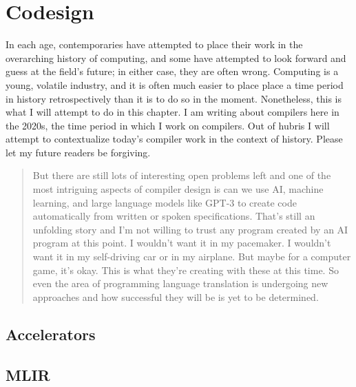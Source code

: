\chapter{Codesign}

In each age, contemporaries have attempted to place their work in the overarching history of computing,
and some have attempted to look forward and guess at the field's future;
in either case, they are often wrong.
Computing is a young, volatile industry, and it is often much easier to place
place a time period in history retrospectively than it is to do so in the moment.
Nonetheless, this is what I will attempt to do in this chapter.
I am writing about compilers here in the 2020s, the time period in which I work on compilers.
Out of hubris I will attempt to contextualize today's compiler work in the context of history.
Please let my future readers be forgiving.

\begin{quotation}
But there are still lots of interesting open problems left and one of the most intriguing aspects of
compiler design is can we use AI, machine learning, and large language models like GPT-3 to create
code automatically from written or spoken specifications. That's still an unfolding story and I'm not willing
to trust any program created by an AI program at this point. I wouldn't want it in my pacemaker. I wouldn't
want it in my self-driving car or in my airplane. But maybe for a computer game, it's okay. This is what
they're creating with these at this time. So even the area of programming language translation is
undergoing new approaches and how successful they will be is yet to be determined.
\cite{aho_oral_history_2022}
\end{quotation}

\section{Accelerators}
\section{MLIR}
